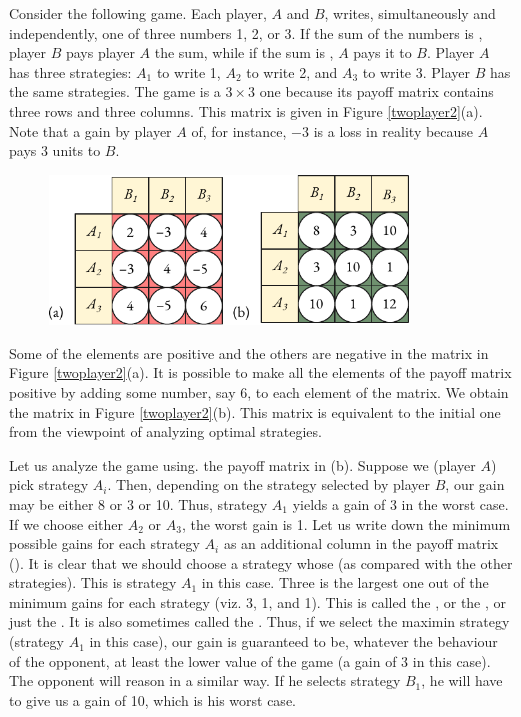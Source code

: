 Consider the following game. Each player, $A$ and $B$, writes, simultaneously
and independently, one of three numbers 1, 2, or 3. If the sum of
the numbers is , player $B$ pays player $A$ the sum, while if the sum is , $A$ pays it to $B$. Player $A$ has three strategies: $A_{1}$ to write 1, $A_{2}$ to write 2, and $A_{3}$ to write 3. Player $B$ has the same strategies. The game is a $3 \times 3$ one because its payoff matrix contains three rows and three columns. This matrix is given in Figure \ref{twoplayer2}(a). Note that a gain by player $A$ of, for instance, $-3$ is a loss in reality because $A$ pays 3 units to $B$. 

 \begin{figure}[!h]
 \centering
 \includegraphics[width=0.85\textwidth]{figures/two-player2.pdf}
 \end{figure}


Some of the elements are positive and the others are negative in the matrix in Figure \ref{twoplayer2}(a). It is possible to make all the elements of the payoff matrix positive by adding some number, say 6, to each element of the
matrix. We obtain the matrix in Figure \ref{twoplayer2}(b). This matrix is equivalent to the initial one from the viewpoint of analyzing optimal strategies.

 Let us analyze the game using. the payoff
matrix in (b). Suppose we (player $A$) pick strategy $A_{i}$. Then, depending on the strategy selected by player $B$, our gain may be either 8 or 3 or 10. Thus, strategy $A_{1}$ yields a gain of 3 in the worst case. If we choose either $A_{2}$ or $A_{3}$, the worst gain is 1. Let us write down the
minimum possible gains for each strategy $A_{i}$ as an additional column in
the payoff matrix (). It is clear that we should choose a strategy whose  (as compared with the other strategies). This is strategy $A_{1}$ in this case. Three is the largest one out of the minimum gains for each strategy (viz. 3, 1, and 1). This is called
the , or the , or just the . It is also sometimes called the . Thus, if we select the maximin strategy (strategy $A_{1}$ in this case), our gain is guaranteed to be, whatever the behaviour of the opponent, at least the lower value of the game (a gain of 3 in this case). The opponent will reason in a similar way. If he selects
strategy $B_{1}$, he will have to give us a gain of 10, which is his worst case.

